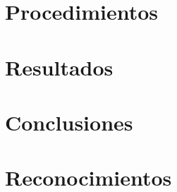 \documentclass[journal]{IEEEtran}
\begin{document}
\section{Procedimientos}


\section{Resultados}


\section{Conclusiones}


\appendices


\section*{Reconocimientos}





\end{document}
